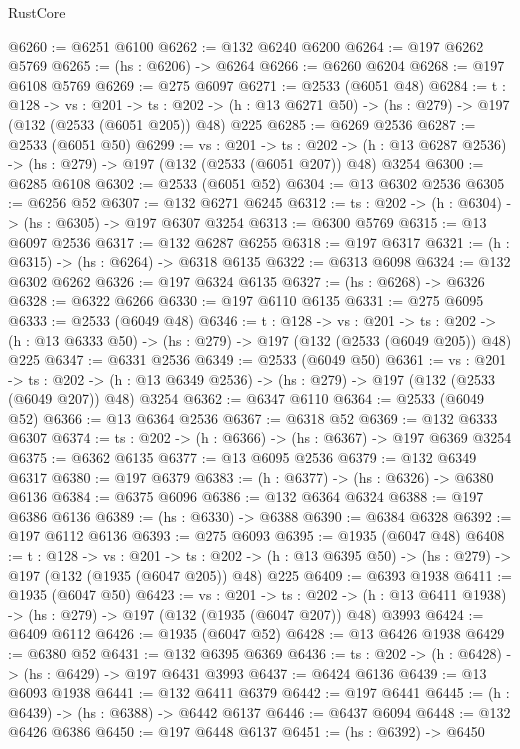 \begin{lexlean}{RustCore}
\begin{coremodule}
@6260 := @6251 @6100
@6262 := @132 @6240 @6200
@6264 := @197 @6262 @5769
@6265 := (hs : @6206) -> @6264
@6266 := @6260 @6204
@6268 := @197 @6108 @5769
@6269 := @275 @6097
@6271 := @2533 (@6051 @48)
@6284 := {t : @128} ->
  {vs : @201} ->
  {ts : @202} -> (h : @13 @6271 @50) -> (hs : @279) -> @197 (@132 (@2533 (@6051 @205)) @48) @225
@6285 := @6269 @2536
@6287 := @2533 (@6051 @50)
@6299 := {vs : @201} ->
  {ts : @202} -> (h : @13 @6287 @2536) -> (hs : @279) -> @197 (@132 (@2533 (@6051 @207)) @48) @3254
@6300 := @6285 @6108
@6302 := @2533 (@6051 @52)
@6304 := @13 @6302 @2536
@6305 := @6256 @52
@6307 := @132 @6271 @6245
@6312 := {ts : @202} -> (h : @6304) -> (hs : @6305) -> @197 @6307 @3254
@6313 := @6300 @5769
@6315 := @13 @6097 @2536
@6317 := @132 @6287 @6255
@6318 := @197 @6317
@6321 := (h : @6315) -> (hs : @6264) -> @6318 @6135
@6322 := @6313 @6098
@6324 := @132 @6302 @6262
@6326 := @197 @6324 @6135
@6327 := (hs : @6268) -> @6326
@6328 := @6322 @6266
@6330 := @197 @6110 @6135
@6331 := @275 @6095
@6333 := @2533 (@6049 @48)
@6346 := {t : @128} ->
  {vs : @201} ->
  {ts : @202} -> (h : @13 @6333 @50) -> (hs : @279) -> @197 (@132 (@2533 (@6049 @205)) @48) @225
@6347 := @6331 @2536
@6349 := @2533 (@6049 @50)
@6361 := {vs : @201} ->
  {ts : @202} -> (h : @13 @6349 @2536) -> (hs : @279) -> @197 (@132 (@2533 (@6049 @207)) @48) @3254
@6362 := @6347 @6110
@6364 := @2533 (@6049 @52)
@6366 := @13 @6364 @2536
@6367 := @6318 @52
@6369 := @132 @6333 @6307
@6374 := {ts : @202} -> (h : @6366) -> (hs : @6367) -> @197 @6369 @3254
@6375 := @6362 @6135
@6377 := @13 @6095 @2536
@6379 := @132 @6349 @6317
@6380 := @197 @6379
@6383 := (h : @6377) -> (hs : @6326) -> @6380 @6136
@6384 := @6375 @6096
@6386 := @132 @6364 @6324
@6388 := @197 @6386 @6136
@6389 := (hs : @6330) -> @6388
@6390 := @6384 @6328
@6392 := @197 @6112 @6136
@6393 := @275 @6093
@6395 := @1935 (@6047 @48)
@6408 := {t : @128} ->
  {vs : @201} ->
  {ts : @202} -> (h : @13 @6395 @50) -> (hs : @279) -> @197 (@132 (@1935 (@6047 @205)) @48) @225
@6409 := @6393 @1938
@6411 := @1935 (@6047 @50)
@6423 := {vs : @201} ->
  {ts : @202} -> (h : @13 @6411 @1938) -> (hs : @279) -> @197 (@132 (@1935 (@6047 @207)) @48) @3993
@6424 := @6409 @6112
@6426 := @1935 (@6047 @52)
@6428 := @13 @6426 @1938
@6429 := @6380 @52
@6431 := @132 @6395 @6369
@6436 := {ts : @202} -> (h : @6428) -> (hs : @6429) -> @197 @6431 @3993
@6437 := @6424 @6136
@6439 := @13 @6093 @1938
@6441 := @132 @6411 @6379
@6442 := @197 @6441
@6445 := (h : @6439) -> (hs : @6388) -> @6442 @6137
@6446 := @6437 @6094
@6448 := @132 @6426 @6386
@6450 := @197 @6448 @6137
@6451 := (hs : @6392) -> @6450

\end{coremodule}
\end{lexlean}
